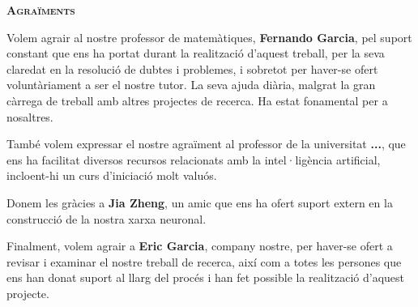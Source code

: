 \setlength{\parskip}{4pt}
\begin{modernquote}
\textsc{\textbf{Agraïments}}\par
{}
\raggedright
Volem agrair al nostre professor de matemàtiques, \textbf{Fernando Garcia}, pel suport constant que ens ha portat durant la realització d’aquest treball, per la seva claredat en la resolució de dubtes i problemes, i sobretot per haver-se ofert voluntàriament a ser el nostre tutor. La seva ajuda diària, malgrat la gran càrrega de treball amb altres projectes de recerca. Ha estat fonamental per a nosaltres.\par

També volem expressar el nostre agraïment al professor de la universitat \textbf{...}, que ens ha facilitat diversos recursos relacionats amb la intel·ligència artificial, incloent-hi un curs d’iniciació molt valuós.\par

Donem les gràcies a \textbf{Jia Zheng}, un amic que ens ha ofert suport extern en la construcció de la nostra xarxa neuronal.\par

Finalment, volem agrair a \textbf{Eric Garcia}, company nostre, per haver-se ofert a revisar i examinar el nostre treball de recerca, així com a totes les persones que ens han donat suport al llarg del procés i han fet possible la realització d’aquest projecte.
\end{modernquote}
\clearpage
